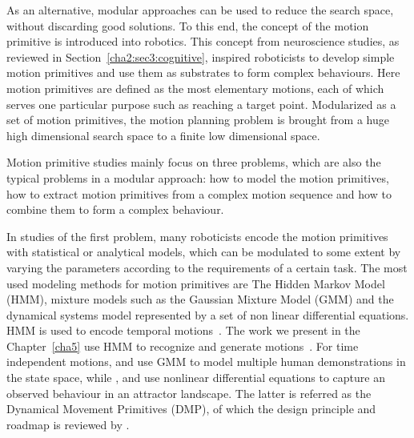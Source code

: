 As an alternative, modular approaches can be used to reduce the search space, without discarding good solutions. To this end, the concept of the motion primitive is introduced into robotics.
This concept from neuroscience studies, as reviewed in Section~\ref{cha2:sec3:cognitive}, inspired roboticists to develop simple motion primitives and use them as substrates to form complex behaviours. Here motion primitives are defined as the most elementary motions, each of which serves one particular purpose such as reaching a target point. Modularized as a set of motion primitives, the motion planning problem is brought from a huge high dimensional search space to a finite low dimensional space.




Motion primitive studies mainly focus on three problems, which are also the typical problems in a modular approach: how to model the motion primitives, how to extract motion primitives from a complex motion sequence and how to combine them to form a complex behaviour.


In studies of the first problem, many roboticists encode the motion primitives with statistical or analytical models, which can be modulated to some extent by varying the parameters according to the requirements of a certain task. The most used modeling methods for motion primitives are The Hidden Markov Model (HMM), mixture models such as the Gaussian Mixture Model (GMM) and the dynamical systems model represented by a set of non linear differential equations. HMM is used to encode temporal motions~\citep{inamura2004embodied,kulic2008incremental,takano2008integrating,lee2010incremental}. The work we present in the Chapter~\ref{cha5} use HMM to recognize and generate motions~\citep{bidan2013robio}. For time independent motions, \citet{gribovskaya2010learning} and \citet{khansari2010imitation} use GMM to model multiple human demonstrations in the state space, while \citet{ijspeert2002movement,Ijspeert2003attractor}, \citet{schaal2005learning} and \citet{peters2008reinforcement} use nonlinear differential equations to capture an observed behaviour in an attractor landscape. The latter is referred as the Dynamical Movement Primitives (DMP), of which the design principle and roadmap is reviewed by \citet{ijspeert2013dynamical}.

